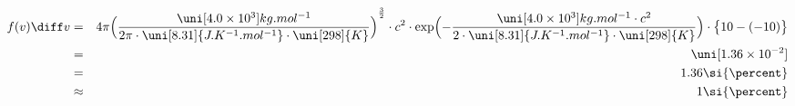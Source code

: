 \begin{eqnarray*}
f(v)\diff v 
&=&
4\pi 
{
\Bigl(
\frac
{\uni[4.0 \times 10^{3}]{kg.mol^{-1}}}
{2\pi \cdot \uni[8.31]{J.K^{-1}.mol^{-1}}  \cdot \uni[298]{K}}
\Bigr) 
}^\frac{3}{2} 
\cdot
c^2
\cdot
\exp 
\Bigl( 
- \frac
{\uni[4.0 \times 10^{3}]{kg.mol^{-1}} \cdot c^2}
{2 \cdot \uni[8.31]{J.K^{-1}.mol^{-1}}  \cdot \uni[298]{K}}
\Bigr) 
\cdot
\bigl\{
    10 - (-10)
\bigr\}
\\ &=&
\uni[1.36 \times 10^{-2}]{}
\\ &=&
1.36\si{\percent}
\\ &\approx&
1\si{\percent}
\label{}
\end{eqnarray*}
